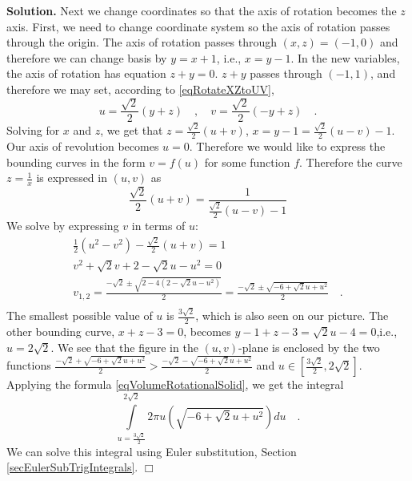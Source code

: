 \documentclass[12pt]{book}
\newenvironment{solution}{\textbf{Solution.} }{$\Box$}
\begin{document}
\begin{solution}
Next we change coordinates so that the axis of rotation becomes the $z$ axis. First, we need to change coordinate system so the axis of rotation passes through the origin. The axis of rotation passes through $(x,z)=(-1,0)$ and therefore we can change basis by $y=x+1$, i.e., $x=y-1$. In the new variables, the axis of rotation has equation $z+y=0$. $z+y$ passes through $(-1,1)$, and therefore we may set, according to \eqref{eqRotateXZtoUV}, 
\[
u=\frac{\sqrt{2}}{2}(y+z)\quad,\quad v=\frac{\sqrt{2}}{2}(-y+z)\quad .
\]
Solving for $x$ and $z$, we get that $z=\frac{\sqrt{2}}{2}(u+v)$, $x=y-1=\frac{\sqrt{2}}{2}(u-v)-1$. Our axis of revolution becomes $u=0$. Therefore we would like to express the bounding curves in the form $v=f(u)$ for some function $f$. Therefore the curve $z=\frac{1}{x}$ is expressed in $(u,v)$ as 
\[
\frac{\sqrt{2}}{2}(u+v)= \frac{1}{\frac{\sqrt{2}}{2}(u-v)-1}
\]
We solve by expressing $v$ in terms of $u$:
\[
\begin{array}{l}
\frac{1}{2}(u^2-v^2)-\frac{\sqrt{2}}{2}(u+v)=1 \\
v^2+\sqrt{2}v+2-\sqrt{2}u- u^2=0 \\
v_{1,2}=\frac{-\sqrt{2}\pm \sqrt{2-4(2-\sqrt{2}u- u^2)} }2=
\frac{-\sqrt{2}\pm \sqrt{-6+\sqrt{2}u+ u^2} }2\quad .
\\
\end{array}
\]
The smallest possible value of $u$ is $\frac{3\sqrt{2}}2$, which is also seen on our picture.  The other bounding curve, $x+z-3=0$, becomes $y-1+z-3=\sqrt{2}u -4=0 $,i.e., $u=2\sqrt{2}$. We see that the figure in the $(u,v)$-plane is enclosed by the two functions $\frac{-\sqrt{2}+ \sqrt{-6+\sqrt{2}u+ u^2} }2>\frac{-\sqrt{2}- \sqrt{-6+\sqrt{2}u+ u^2} }2$ and $u\in [\frac{3\sqrt{2}}2, 2\sqrt{2}]$.  Applying the formula \eqref{eqVolumeRotationalSolid}, we get the integral 
\[
\int\limits_{u=\frac{3\sqrt{2}}2}^{2\sqrt{2}} 2\pi u\left(\sqrt{-6+\sqrt{2}u+ u^2}\right)du\quad .
\]
We can solve this integral using Euler substitution, Section \ref{secEulerSubTrigIntegrals}. %
\end{solution}
\end{document}
